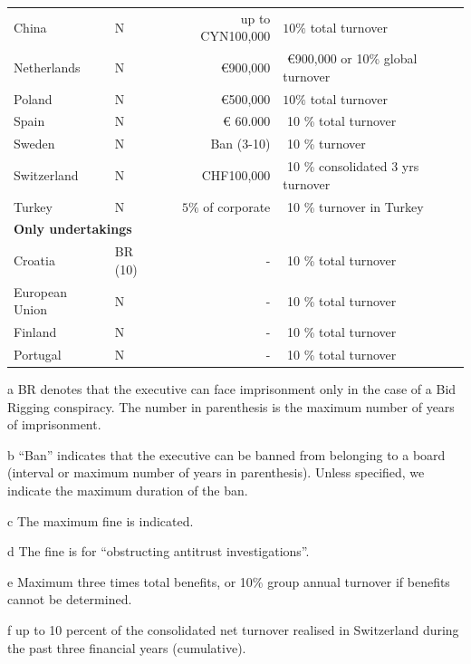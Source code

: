 \documentclass[]{article}
\begin{document}
\begin{table}[htp]
\begin{threeparttable}
\begin{tabular}{llrl}
	China  &N & up to CYN100,000\tnote{d} &  $  10\%$ total turnover\\
	Netherlands &N & $ $ €900,000 &$ $ €900,000 or 10\% global turnover  \\
	Poland  & N& €500,000   & $  10\%$ total turnover \\
	Spain   & N& € 60.000 & $ $ 10 \% total turnover \\
	Sweden  &N& Ban (3-10) & $ $ 10 \%  turnover \\
	Switzerland &N  & CHF100,000 & $ $ 10 \% consolidated 3 yrs turnover\tnote{f} \\
	Turkey   & N & $  5\%$ of corporate &$ $ 10 \% turnover in Turkey  \\
\toprule	
	\multicolumn{4}{l}{\bf{Only undertakings}}\\[0.4em]
	Croatia   &BR (10) &- & $ $ 10 \% total turnover \\
	European Union  &N & - & $ $ 10 \% total turnover \\
	Finland   &N& - &  $ $ 10 \% total turnover\\
	Portugal   &N& - &$ $ 10 \% total turnover  \\
\bottomrule
	\end{tabular}
	\begin{tablenotes}
		\item[a] BR denotes that the executive can face imprisonment only in the case of a Bid Rigging conspiracy. The number in parenthesis is the maximum number of years of imprisonment.
		\item[b] ``Ban'' indicates that the executive can be banned from belonging to a board (interval or maximum number of years in parenthesis). Unless specified, we indicate the maximum duration of the ban.
		\item[c] The maximum fine is indicated.
		\item[d] The fine is for ``obstructing antitrust investigations''.
		\item[e] Maximum three times total benefits, or 10\% group annual turnover if benefits cannot be determined.  
		\item[f] up to 10 percent of the consolidated net turnover realised in Switzerland during the past three financial years (cumulative). 
	\end{tablenotes}
	\end{threeparttable}
\end{table}
\end{document}
